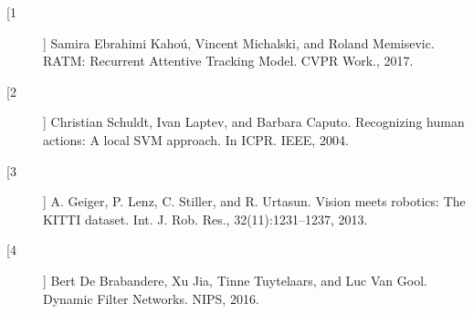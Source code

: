 
\vspace{.5\baselineskip}

{\large
\begin{description}
    \item[[1]] Samira Ebrahimi Kahoú, Vincent Michalski, and Roland Memisevic. RATM: Recurrent Attentive Tracking Model. CVPR Work., 2017.
    \item[[2]] Christian Schuldt, Ivan Laptev, and Barbara Caputo. Recognizing human actions: A local SVM approach. In ICPR. IEEE, 2004.
    \item[[3]] A. Geiger, P. Lenz, C. Stiller, and R. Urtasun. Vision meets robotics: The KITTI dataset. Int. J. Rob. Res.,
    32(11):1231–1237, 2013.
    \item [[4]] Bert De Brabandere, Xu Jia, Tinne Tuytelaars, and Luc Van Gool. Dynamic Filter Networks. NIPS, 2016.
\end{description}
}
